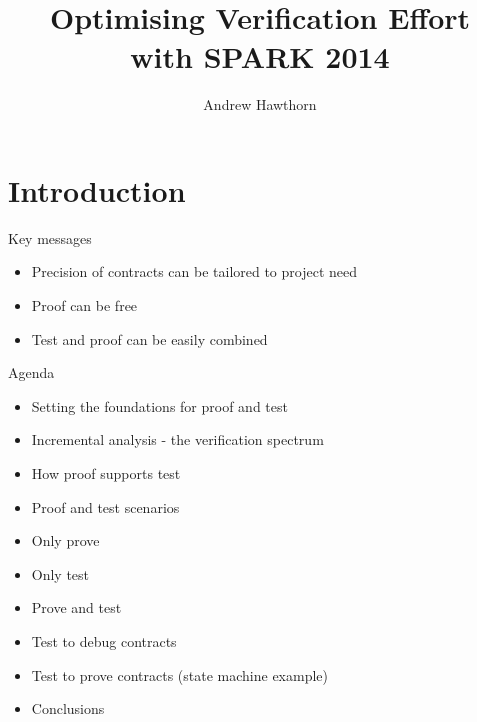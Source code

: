 \documentclass{beamer}
\title{Optimising Verification Effort\\with SPARK 2014}
\author{Andrew Hawthorn}
\begin{document}
\begin{altrantitle}
\end{altrantitle}


\makeatletter
\newenvironment{btHighlight}[1][]
{\begingroup\tikzset{bt@Highlight@par/.style={#1}}\begin{lrbox}{\@tempboxa}}
{\end{lrbox}\bt@HL@box[bt@Highlight@par]{\@tempboxa}\endgroup}

\newcommand\btHL[1][]{%
  \begin{btHighlight}[#1]\bgroup\aftergroup\bt@HL@endenv%
}
\def\bt@HL@endenv{%
  \end{btHighlight}%
  \egroup
}
\newcommand{\bt@HL@box}[2][]{%
  \tikz[remember picture]{%
    \pgfpathrectangle{\pgfpoint{1pt}{0pt}}{\pgfpoint{\wd #2}{\ht #2}}%
    \pgfusepath{use as bounding box}%
    \node[anchor=base west,%
          outer sep=0pt,%
          inner xsep=1pt,%
          inner ysep=0pt,%
          rounded corners=2pt,%
          minimum height=\ht\strutbox+1pt,%
          #1]%
          {%
            \raisebox{1pt}{\strut}\strut\usebox{#2}%
          };%
  }%
}
\makeatother

\section{Introduction}

\begin{frame}[fragile]{Key messages}
  \begin{itemize}
  \item Precision of contracts can be tailored to project need
  \item Proof can be free
  \item Test and proof can be easily combined

  \end{itemize}
\end{frame}

\begin{frame}[fragile]{Agenda}
  \begin{itemize}
     \item Setting the foundations for proof and test
     \item Incremental analysis - the verification spectrum
     \item How proof supports test
     \item Proof and test scenarios
     \item Only prove
     \item Only test
     \item Prove and test
     \item Test to debug contracts
     \item Test to prove contracts (state machine example)
     \item Conclusions
  \end{itemize}
\end{frame}
\end{document}
